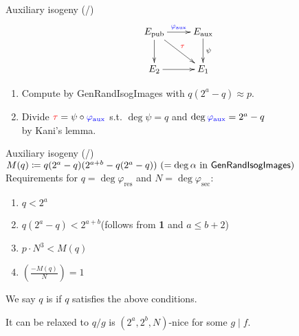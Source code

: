 \begin{frame}{Auxiliary isogeny (/\auxRIItotal{})}
    $$
        \xymatrix{
            E_\mathrm{pub} \ar[r]^{\blue{\varphi_\mathrm{aux}}} \ar[d] \ar[dr]^{\red{\tau}} & E_\mathrm{aux} \ar[d]^\psi \\
            E_2 \ar[r] & E_1
        }
    $$
    \begin{enumerate}
        \item Compute \red{$\tau$} by \textsf{GenRandIsogImages} with $q(2^a - q) \approx p$.
        \item Divide $\textcolor{red}{\tau} = \psi \circ \textcolor{blue}{\varphi_\mathrm{aux}}$
            s.t. $\deg\psi = q$ and $\deg\textcolor{blue}{\varphi_\mathrm{aux}} = 2^a - q$\\
            by Kani's lemma.
    \end{enumerate}
\end{frame}

\begin{frame}{Auxiliary isogeny (/\auxRIItotal{})}
    $M(q) \coloneqq q(2^a - q)(2^{a + b} - q(2^a - q))\ (= \deg\alpha \text{ in \textsf{GenRandIsogImages}})$\\

    \vspace{10pt}
    Requirements for $q = \deg\varphi_\mathrm{res}$ and $N = \deg\varphi_\mathrm{sec}$:
    \begin{enumerate}
        \item $q < 2^a$
        \item $q(2^a - q) < 2^{a + b}$\quad (follows from \textbf{1} and $a \leq b + 2$)
        \item $p \cdot N^3 < M(q)$
        \item $\left(\frac{-M(q)}{N}\right) = 1$
    \end{enumerate}
    We say $q$ is  if $q$ satisfies the above conditions.

    \vspace{20pt}
    It can be relaxed to
    $q/g$ is $(2^a, 2^b, N)$-nice for some $g \mid f$.\\[3pt]
\end{frame}
